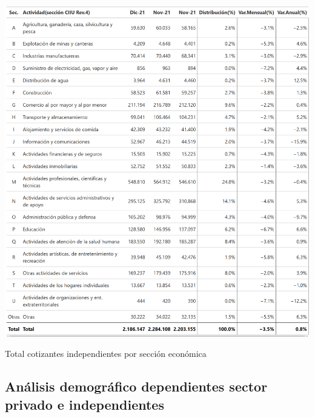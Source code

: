 \begin{table}[!htbp]
\centering
\includegraphics[width = 15cm]{results/02_longitudinal/salida_act_econ_independientes_21.png}
\caption{Total cotizantes independientes por sección económica}%
\label{tabla:independientes:actividad_economica}
\end{table}

\FloatBarrier
\subsection{Análisis demográfico dependientes sector privado e independientes}

